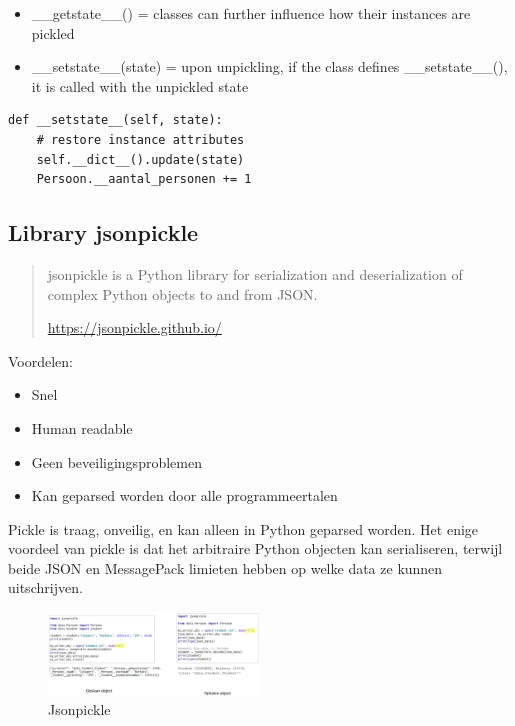 \documentclass{article}
\begin{document}
\begin{itemize}
    \item \_\_getstate\_\_() = classes can further influence how their instances are pickled 
    \item \_\_setstate\_\_(state) = upon unpickling, if the class defines \_\_setstate\_\_(), it is called with the unpickled state
\end{itemize}

\begin{verbatim}
def __setstate__(self, state):
    # restore instance attributes
    self.__dict__().update(state)
    Persoon.__aantal_personen += 1
\end{verbatim}

\subsection{Library jsonpickle}

\begin{quotation}
    jsonpickle is a Python library for serialization and deserialization of complex
Python objects to and from JSON.

\url{https://jsonpickle.github.io/}
\end{quotation}

Voordelen:

\begin{itemize}
    \item Snel
    \item Human readable
    \item Geen beveiligingsproblemen
    \item Kan geparsed worden door alle programmeertalen
\end{itemize}

Pickle is traag, onveilig, en kan alleen in Python geparsed worden. 
Het enige voordeel van pickle is dat het arbitraire Python objecten kan serialiseren,
terwijl beide JSON en MessagePack limieten hebben op welke data ze kunnen uitschrijven.

\begin{figure}[H]
    \centering
    \includegraphics[width=0.5\textwidth]{jsonpickle.png}
    \caption{Jsonpickle}
\end{figure}
\end{document}
